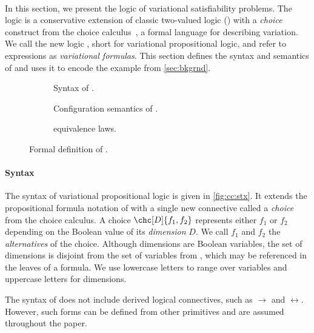 ~\label{chapter:vlogic}

In this section, we present the logic of variational satisfiability problems.
%
The logic is a conservative extension of classic two-valued logic (\pl{})
with a \emph{choice} construct from the choice
calculus~\cite{EW11tosem,Walk13thesis}, a formal language for describing
variation. We call the new logic \vpl{}, short for variational propositional
logic, and refer to \vpl{} expressions as \emph{variational formulas}.
%
This section defines the syntax and semantics of \vpl{} and uses it to encode
the example from \autoref{sec:bkgrnd}.


\begin{figure}
  \begin{subfigure}[t]{\linewidth}
    \centering
    
    \caption{Syntax of \vpl{}.}%
    \label{fig:cc:stx}
  \end{subfigure}
%
  \begin{subfigure}[t]{\linewidth}
    
    \centering
    \caption{Configuration semantics of \vpl{}.}%
    \label{fig:cc:cfg}
  \end{subfigure}
%
  \begin{subfigure}[t]{\linewidth}
    
    \centering
    \caption{\vpl{} equivalence laws.}%
    \label{fig:cc:eqv}
  \end{subfigure}
\caption{Formal definition of \vpl{}.}%
\label{fig:cc}
\end{figure}
%

\paragraph{Syntax}
%
The syntax of variational propositional logic is given in
\autoref{fig:cc:stx}. It extends the propositional formula notation of \pl{}
with a single new connective called a \emph{choice} from the choice calculus.
%
A choice $\chc[D]{f_1,f_2}$ represents either $f_1$ or $f_2$ depending on the
Boolean value of its \emph{dimension} $D$. We call $f_1$ and $f_2$ the
\emph{alternatives} of the choice.
%
Although dimensions are Boolean variables, the set of dimensions is disjoint
from the set of variables from \pl{}, which may be referenced in the leaves of
a formula. We use lowercase letters to range over variables and uppercase
letters for dimensions.

The syntax of \vpl{} does not include derived logical connectives, such as
$\rightarrow$ and $\leftrightarrow$. However, such forms can be defined
  from other primitives and are assumed throughout the paper.

